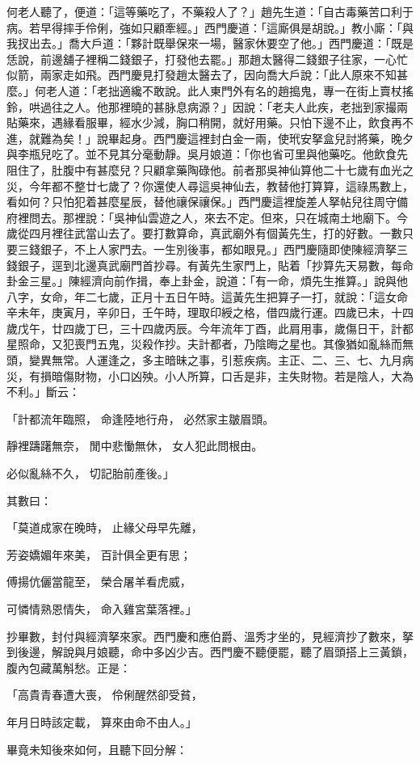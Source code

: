\begin{showcontents}{}
何老人聽了，便道：「這等藥吃了，不藥殺人了？」趙先生道：「自古毒藥苦口利于病。若早得摔手伶俐，強如只顧牽經。」西門慶道：「這廝俱是胡說。」教小廝：「與我扠出去。」喬大戶道：「夥計既舉保來一場，醫家休要空了他。」西門慶道：「既是恁說，前邊舖子裡稱二錢銀子，打發他去罷。」那趙太醫得二錢銀子往家，一心忙似箭，兩家走如飛。西門慶見打發趙太醫去了，因向喬大戶說：「此人原來不知甚麼。」何老人道：「老拙適纔不敢說。此人東門外有名的趙搗鬼，專一在街上賣杖搖鈴，哄過往之人。他那裡曉的甚脉息病源？」因說：「老夫人此疾，老拙到家撮兩貼藥來，遇緣看服畢，經水少減，胸口稍開，就好用藥。只怕下邊不止，飲食再不進，就難為矣！」說畢起身。西門慶這裡封白金一兩，使玳安拏盒兒討將藥，晚夕與李瓶兒吃了。並不見其分毫動靜。吳月娘道：「你也省可里與他藥吃。他飲食先阻住了，肚腹中有甚麼兒？只顧拿藥陶碌他。前者那吳神仙算他二十七歲有血光之災，今年都不整廿七歲了？你還使人尋這吳神仙去，教替他打算算，這祿馬數上，看如何？只怕犯着甚麼星辰，替他禳保禳保。」西門慶這裡旋差人拏帖兒往周守備府裡問去。那裡說：「吳神仙雲遊之人，來去不定。但來，只在城南土地廟下。今歲從四月裡往武當山去了。要打數算命，真武廟外有個黃先生，打的好數。一數只要三錢銀子，不上人家門去。一生別後事，都如眼見。」西門慶隨即使陳經濟拏三錢銀子，逕到北邊真武廟門首抄尋。有黃先生家門上，貼着「抄算先天易數，每命卦金三星。」陳經濟向前作揖，奉上卦金，說道：「有一命，煩先生推算。」說與他八字，女命，年二七歲，正月十五日午時。這黃先生把算子一打，就說：「這女命辛未年，庚寅月，辛卯日，壬午時，理取印綬之格，借四歲行運。四歲已未，十四歲戊午，廿四歲丁巳，三十四歲丙辰。今年流年丁酉，此肩用事，歲傷日干，計都星照命，又犯喪門五鬼，災殺作抄。夫計都者，乃陰晦之星也。其像猶如亂絲而無頭，變異無常。人運逢之，多主暗昧之事，引惹疾病。主正、二、三、七、九月病災，有損暗傷財物，小口凶殃。小人所算，口舌是非，主失財物。若是陰人，大為不利。」斷云：

「計都流年臨照，  命逢陸地行舟，  必然家主皺眉頭。

靜裡躊躇無奈，  閒中悲慟無休，  女人犯此問根由。

必似亂絲不久，  切記胎前產後。」

其數曰：

「莫道成家在晚時，  止緣父母早先離，

芳姿嬌媚年來美，  百計俱全更有思；

傅揚伉儷當龍至，  榮合屠羊看虎威，

可憐情熟恩情失，  命入雞宮葉落裡。」

抄畢數，封付與經濟拏來家。西門慶和應伯爵、溫秀才坐的，見經濟抄了數來，拏到後邊，解說與月娘聽，命中多凶少吉。西門慶不聽便罷，聽了眉頭搭上三黃鎖，腹內包藏萬斛愁。正是：

「高貴青春遭大喪，  伶俐醒然卻受貧，

年月日時該定載，  算來由命不由人。」

畢竟未知後來如何，且聽下回分解：





\end{showcontents}


